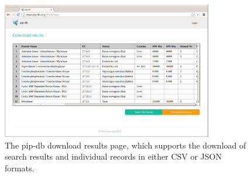 \begin{figure}[H]
\centering
    \includegraphics[width=0.82\textwidth]{assets/pip-db-download}
\caption[pip-db download results page]
        {The pip-db download results page, which supports the download
          of search results and individual records in either CSV or
          JSON formats.}
\label{fig:pip-db-download}
\end{figure}
